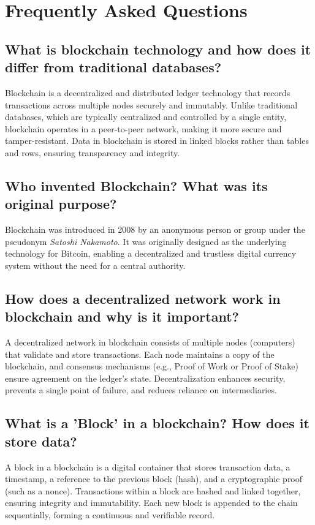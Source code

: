 \documentclass[11pt]{article}
\begin{document}
\section{Frequently Asked Questions}

\subsection{What is blockchain technology and how does it differ from traditional databases?}

Blockchain is a decentralized and distributed ledger technology that records transactions across multiple nodes securely and immutably. Unlike traditional databases, which are typically centralized and controlled by a single entity, blockchain operates in a peer-to-peer network, making it more secure and tamper-resistant. Data in blockchain is stored in linked blocks rather than tables and rows, ensuring transparency and integrity.

\subsection{Who invented Blockchain? What was its original purpose?}

Blockchain was introduced in 2008 by an anonymous person or group under the pseudonym \textit{Satoshi Nakamoto}. It was originally designed as the underlying technology for Bitcoin, enabling a decentralized and trustless digital currency system without the need for a central authority.

\subsection{How does a decentralized network work in blockchain and why is it important?}

A decentralized network in blockchain consists of multiple nodes (computers) that validate and store transactions. Each node maintains a copy of the blockchain, and consensus mechanisms (e.g., Proof of Work or Proof of Stake) ensure agreement on the ledger’s state. Decentralization enhances security, prevents a single point of failure, and reduces reliance on intermediaries.

\subsection{What is a 'Block' in a blockchain? How does it store data?}

A block in a blockchain is a digital container that stores transaction data, a timestamp, a reference to the previous block (hash), and a cryptographic proof (such as a nonce). Transactions within a block are hashed and linked together, ensuring integrity and immutability. Each new block is appended to the chain sequentially, forming a continuous and verifiable record.
\end{document}
